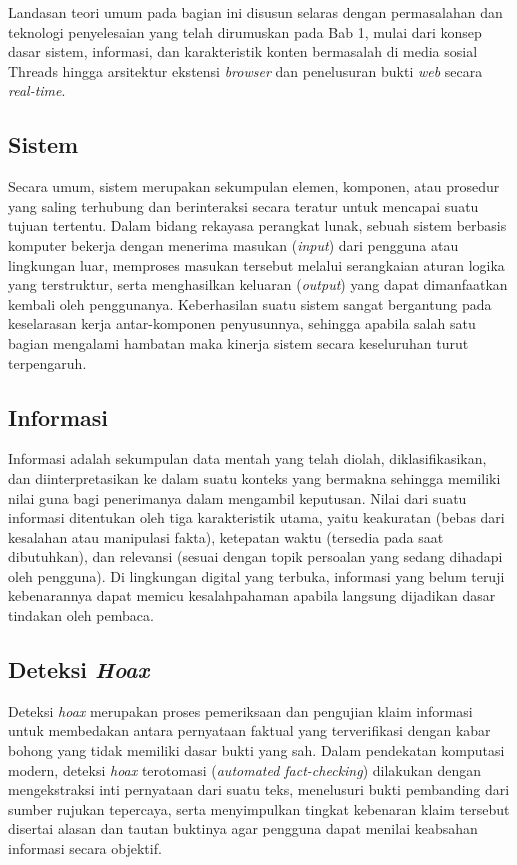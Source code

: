 \documentclass[12pt,a4paper,twoside]{report}
\begin{document}
Landasan teori umum pada bagian ini disusun selaras dengan permasalahan dan teknologi penyelesaian yang telah dirumuskan pada Bab 1, mulai dari konsep dasar sistem, informasi, dan karakteristik konten bermasalah di media sosial Threads hingga arsitektur ekstensi \textit{browser} dan penelusuran bukti \textit{web} secara \textit{real-time}.

\subsection{Sistem}

Secara umum, sistem merupakan sekumpulan elemen, komponen, atau prosedur yang saling terhubung dan berinteraksi secara teratur untuk mencapai suatu tujuan tertentu. Dalam bidang rekayasa perangkat lunak, sebuah sistem berbasis komputer bekerja dengan menerima masukan (\textit{input}) dari pengguna atau lingkungan luar, memproses masukan tersebut melalui serangkaian aturan logika yang terstruktur, serta menghasilkan keluaran (\textit{output}) yang dapat dimanfaatkan kembali oleh penggunanya. Keberhasilan suatu sistem sangat bergantung pada keselarasan kerja antar-komponen penyusunnya, sehingga apabila salah satu bagian mengalami hambatan maka kinerja sistem secara keseluruhan turut terpengaruh.

\subsection{Informasi}

Informasi adalah sekumpulan data mentah yang telah diolah, diklasifikasikan, dan diinterpretasikan ke dalam suatu konteks yang bermakna sehingga memiliki nilai guna bagi penerimanya dalam mengambil keputusan. Nilai dari suatu informasi ditentukan oleh tiga karakteristik utama, yaitu keakuratan (bebas dari kesalahan atau manipulasi fakta), ketepatan waktu (tersedia pada saat dibutuhkan), dan relevansi (sesuai dengan topik persoalan yang sedang dihadapi oleh pengguna). Di lingkungan digital yang terbuka, informasi yang belum teruji kebenarannya dapat memicu kesalahpahaman apabila langsung dijadikan dasar tindakan oleh pembaca.

\subsection{Deteksi \textit{Hoax}}

Deteksi \textit{hoax} merupakan proses pemeriksaan dan pengujian klaim informasi untuk membedakan antara pernyataan faktual yang terverifikasi dengan kabar bohong yang tidak memiliki dasar bukti yang sah. Dalam pendekatan komputasi modern, deteksi \textit{hoax} terotomasi (\textit{automated fact-checking}) dilakukan dengan mengekstraksi inti pernyataan dari suatu teks, menelusuri bukti pembanding dari sumber rujukan tepercaya, serta menyimpulkan tingkat kebenaran klaim tersebut disertai alasan dan tautan buktinya agar pengguna dapat menilai keabsahan informasi secara objektif.
\end{document}
